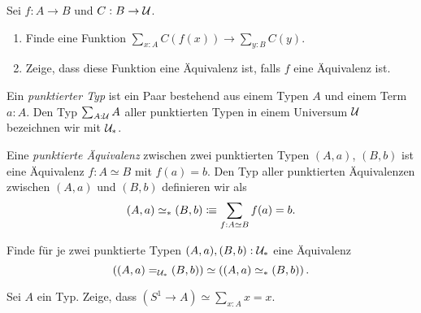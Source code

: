 \documentclass{uebung}
\begin{document}

\begin{exercise}
  Sei $f:A \to B$ und $C : B \to \mathcal{U}$.
  \begin{enumerate}
    \item Finde eine Funktion $\sum_{x:A} C(f(x)) \to \sum_{y:B} C(y)$.
    \item Zeige, dass diese Funktion eine Äquivalenz ist, falls $f$ eine Äquivalenz ist.
  \end{enumerate}

\end{exercise}

\begin{exercise}
  Ein \emph{punktierter Typ} ist ein Paar bestehend aus einem Typen $A$ und einem Term $a:A$.
  Den Typ $\sum_{A:\mathcal{U}}A$ aller punktierten Typen in einem Universum $\mathcal{U}$ bezeichnen wir mit $\mathcal{U}_*$.

  Eine \emph{punktierte Äquivalenz} zwischen zwei punktierten Typen $(A,a)$, $(B,b)$ ist eine Äquivalenz $f:A\simeq B$ mit $f(a)=b$.
  Den Typ aller punktierten Äquivalenzen zwischen $(A,a)$ und $(B,b)$ definieren wir als
  $$
  (A,a) \simeq_* (B,b) \vcentcolon\mspace{-1.2mu}\equiv \sum_{f:A\simeq B} f(a) = b.
  $$

  Finde für je zwei punktierte Typen $(A,a), (B,b) : \mathcal{U}_*$ eine Äquivalenz
  $$
  \left((A,a) =_{\mathcal{U}_*} (B,b)\right) \simeq \left((A,a) \simeq_* (B,b)\right).
  $$
\end{exercise}

\begin{exercise}
  Sei $A$ ein Typ.
  Zeige, dass $(S^1\to A) \simeq \sum_{x:A} x=x$.
\end{exercise}
\end{document}

